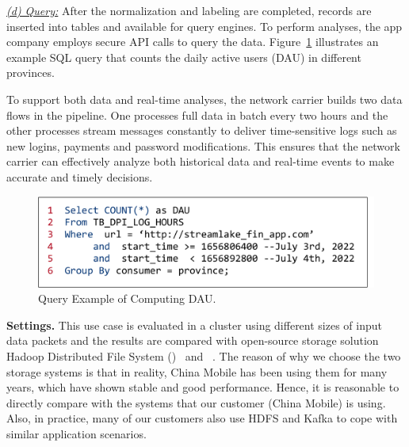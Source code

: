 \noindent \underline{\textit{(d) Query:}} After the normalization and labeling  are completed,   records are inserted into tables and  available for query engines. To perform analyses, the app company employs secure API calls to query the data. Figure~\ref{exp:fig:sql} illustrates an example SQL query that counts the daily active users (DAU) in different provinces.%

To support both  data and real-time analyses, the network carrier builds two data flows in the pipeline. One  processes full data in batch every two hours and the other processes stream messages constantly to deliver time-sensitive logs such as new logins, payments and password modifications. This ensures that the network carrier can effectively analyze both historical data and real-time events to make  accurate and timely decisions.

 \begin{figure}[htbp]
	\includegraphics[scale=0.33]{figures/sql}
	\centering
	\vspace{-1.3em}
	\caption{Query Example of Computing DAU.}
	\label{exp:fig:sql}
	\vspace{-2em}
\end{figure}

\noindent \textbf{Settings.} This use case is evaluated in a  cluster using different sizes of input data packets and the results are compared with open-source storage solution Hadoop Distributed File System (\hdfs)~\cite{hdfs} and \kafka~\cite{kafka}. The reason of why we choose the two storage systems is that in reality, China Mobile has been using them for many years, which have shown stable and good performance. Hence, it is  reasonable to directly compare with the systems that our customer (China Mobile) is using. Also, in practice, many of our customers also use HDFS and Kafka to cope with similar application scenarios.




